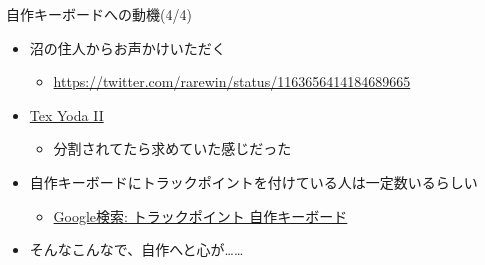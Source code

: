 \documentclass[cjk,dvipdfmx,10pt,compress,fragile%
hyperref={bookmarks=true,bookmarksnumbered=true,bookmarksopen=false,%
colorlinks=false,%
pdftitle={第 134 回 関西 Debian 勉強会},%
pdfauthor={小林},%
pdfsubject={資料},%
}]{beamer}
\begin{document}
\begin{frame}[fragile,t]{自作キーボードへの動機(4/4)}
 \begin{itemize}
  \item 沼の住人からお声かけいただく
	\begin{itemize}
	 \item \url{https://twitter.com/rarewin/status/1163656414184689665}
	\end{itemize}
  \item \href{https://mechanicalkeyboards.com/shop/index.php?l=product_detail&p=3532}{Tex Yoda II}
	\begin{itemize}
	 \item 分割されてたら求めていた感じだった
	\end{itemize}
  \item 自作キーボードにトラックポイントを付けている人は一定数いるらしい
	\begin{itemize}
	 \item \href{https://www.google.com/search?client=firefox-b-e&q=%E3%83%88%E3%83%A9%E3%83%83%E3%82%AF%E3%83%9D%E3%82%A4%E3%83%B3%E3%83%88+%E8%87%AA%E4%BD%9C%E3%82%AD%E3%83%BC%E3%83%9C%E3%83%BC%E3%83%89}{Google検索: トラックポイント 自作キーボード}
	\end{itemize}
  \item そんなこんなで、自作へと心が……
 \end{itemize}
\end{frame}
\end{document}
